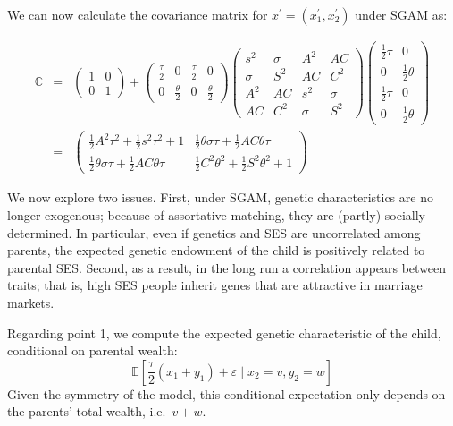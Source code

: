\documentclass[
  12pt,
]{article}
\theoremstyle{definition}
\theoremstyle{definition}
\theoremstyle{definition}
\theoremstyle{definition}
\theoremstyle{remark}
\begin{document}
We can now calculate the covariance matrix for
\(x^\prime = (x_{1}^{\prime }, x_{2}^{\prime })\) under SGAM as:

\begin{eqnarray}
\mathbb{C} &=&\left( 
\begin{array}{cc}
1 & 0 \\ 
0 & 1%
\end{array}%
\right) +\left( 
\begin{array}{cccc}
\frac{\tau }{2} & 0 & \frac{\tau }{2} & 0 \\ 
0 & \frac{\theta }{2} & 0 & \frac{\theta }{2}%
\end{array}%
\right) \allowbreak \left( 
\begin{array}{cccc}
s^{2} & \sigma  & A^{2} & AC \\ 
\sigma  & S^{2} & AC & C^{2} \\ 
A^{2} & AC & s^{2} & \sigma  \\ 
AC & C^{2} & \sigma  & S^{2}%
\end{array}%
\right) \allowbreak \left( 
\begin{array}{cc}
\frac{1}{2}\tau  & 0 \\ 
0 & \frac{1}{2}\theta  \\ 
\frac{1}{2}\tau  & 0 \\ 
0 & \frac{1}{2}\theta 
\end{array}%
\right) \nonumber \\
&=&\left( 
\begin{array}{cc}
\frac{1}{2}A^{2}\tau ^{2}+\frac{1}{2}s^{2}\tau ^{2}+1 & \frac{1}{2}\theta
\sigma \tau +\frac{1}{2}AC\theta \tau  \\ 
\frac{1}{2}\theta \sigma \tau +\frac{1}{2}AC\theta \tau  & \frac{1}{2}%
C^{2}\theta ^{2}+\frac{1}{2}S^{2}\theta ^{2}+1%
\end{array}%
\right) \allowbreak \label{cov-children-SGAM}
\end{eqnarray}
\newline

We now explore two issues. First, under SGAM, genetic characteristics are no
longer exogenous; because of assortative matching, they are (partly) socially
determined. In particular, even if genetics and SES are uncorrelated among
parents, the expected genetic endowment of the child is positively related to
parental SES. Second, as a result, in the long run a correlation appears between
traits; that is, high SES people inherit genes that are attractive in marriage
markets.

Regarding point 1, we compute the expected genetic characteristic of the
child, conditional on parental wealth:
\[
\mathbb{E}\left[ \frac{\tau }{2}\left( x_{1}+y_{1}\right) +\varepsilon \mid
x_{2}=v,y_{2}=w\right] 
\]
Given the symmetry of the model, this conditional
expectation only depends on the parents' total wealth, i.e.~\(v+w\).
\end{document}
